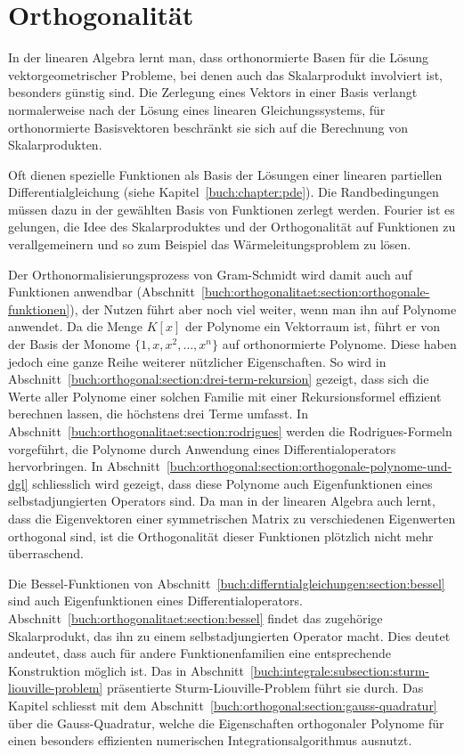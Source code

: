 %
%
%
\chapter{Orthogonalität
\label{buch:chapter:orthogonalitaet}}
In der linearen Algebra lernt man, dass orthonormierte Basen für die
Lösung vektorgeometrischer Probleme, bei denen auch das Skalarprodukt
involviert ist, besonders günstig sind.
Die Zerlegung eines Vektors in einer Basis verlangt normalerweise nach
der Lösung eines linearen Gleichungssystems, für orthonormierte
Basisvektoren beschränkt sie sich auf die Berechnung von Skalarprodukten.

Oft dienen spezielle Funktionen als Basis der Lösungen einer linearen
partiellen Differentialgleichung (siehe Kapitel~\ref{buch:chapter:pde}).
Die Randbedingungen müssen dazu in der gewählten Basis von Funktionen
zerlegt werden.
Fourier ist es gelungen, die Idee des Skalarproduktes und der Orthogonalität
auf Funktionen zu verallgemeinern und so zum Beispiel das Wärmeleitungsproblem
zu lösen.

Der Orthonormalisierungsprozess von Gram-Schmidt wird damit auch auf
Funktionen anwendbar
(Abschnitt~\ref{buch:orthogonalitaet:section:orthogonale-funktionen}),
der Nutzen führt aber noch viel weiter,
wenn man ihn auf Polynome anwendet.
Da die Menge $K[x]$ der Polynome ein Vektorraum ist, führt er von der
Basis der Monome $\{1,x,x^2,\dots,x^n\}$ auf orthonormierte Polynome.
Diese haben jedoch eine ganze Reihe weiterer nützlicher Eigenschaften.
So wird in Abschnitt~\ref{buch:orthogonal:section:drei-term-rekursion}
gezeigt, dass sich die Werte aller Polynome einer solchen Familie mit
einer Rekursionsformel effizient berechnen lassen, die höchstens drei
Terme umfasst.
In Abschnitt~\ref{buch:orthogonalitaet:section:rodrigues} werden
die Rodrigues-Formeln vorgeführt, die Polynome durch Anwendung eines
Differentialoperators hervorbringen.
In Abschnitt~\ref{buch:orthogonal:section:orthogonale-polynome-und-dgl}
schliesslich wird gezeigt, dass diese Polynome auch Eigenfunktionen
eines selbstadjungierten Operators sind.
Da man in der linearen Algebra auch lernt, dass die Eigenvektoren einer
symmetrischen Matrix zu verschiedenen Eigenwerten orthogonal sind,
ist die Orthogonalität dieser Funktionen plötzlich nicht mehr überraschend.

Die Bessel-Funktionen von
Abschnitt~\ref{buch:differntialgleichungen:section:bessel}
sind auch Eigenfunktionen eines Differentialoperators.
Abschnitt~\ref{buch:orthogonalitaet:section:bessel} findet das zugehörige
Skalarprodukt, das ihn zu einem selbstadjungierten Operator macht.
Dies deutet andeutet, dass auch für andere Funktionenfamilien
eine entsprechende Konstruktion möglich ist.
Das in Abschnitt~\ref{buch:integrale:subsection:sturm-liouville-problem}
präsentierte Sturm-Liouville-Problem führt sie durch.
Das Kapitel schliesst mit dem
Abschnitt~\ref{buch:orthogonal:section:gauss-quadratur}
über die Gauss-Quadratur, welche die Eigenschaften orthogonaler Polynome
für einen besonders effizienten numerischen Integrationsalgorithmus
ausnutzt.

